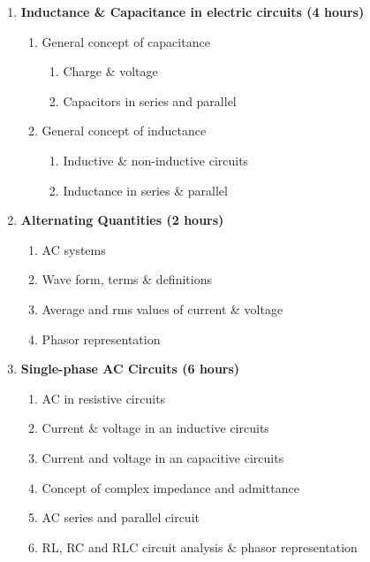 \begin{enumerate}
    \item \textbf{ Inductance \& Capacitance in electric circuits \hfill (4 hours)}
    \begin{enumerate}
        \item General concept of capacitance
        \begin{enumerate}
            \item Charge \& voltage
            \item Capacitors in series and parallel
        \end{enumerate}
        
        \item General concept of inductance
        \begin{enumerate}
            \item Inductive \& non-inductive circuits
            \item Inductance in series \& parallel
        \end{enumerate}
    \end{enumerate}
    
    \item \textbf{ Alternating Quantities \hfill (2 hours)}
    \begin{enumerate}
        \item AC systems
        \item Wave form, terms \& definitions
        \item Average and rms values of current \& voltage
        \item Phasor representation
    \end{enumerate}
    
    \item \textbf{ Single-phase AC Circuits \hfill (6 hours)}
    \begin{enumerate}
        \item AC in resistive circuits
        \item Current \& voltage in an inductive circuits
        \item Current and voltage in an capacitive circuits
        \item Concept of complex impedance and admittance
        \item AC series and parallel circuit
        \item RL, RC and RLC circuit analysis \& phasor representation
    \end{enumerate}
    

\end{enumerate}
